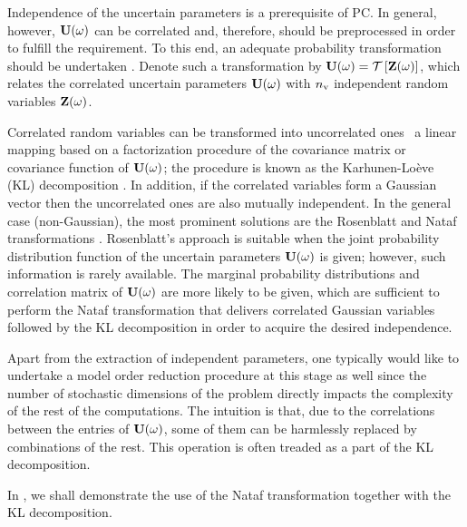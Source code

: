 Independence of the uncertain parameters is a prerequisite of PC.
In general, however, $\mathbf{U}(\omega)$ can be correlated and, therefore, should be preprocessed in order to fulfill the requirement.
To this end, an adequate probability transformation should be undertaken \cite{eldred2009}.
Denote such a transformation by $\vU(\o) = \oTransform{\vZ(\o)}$, which relates the correlated uncertain parameters $\mathbf{U}(\omega)$ with ${n_\text{v}}$ independent random variables $\mathbf{Z}(\omega)$.

Correlated random variables can be transformed into uncorrelated ones \via\ a linear mapping based on a factorization procedure of the covariance matrix or covariance function of $\mathbf{U}(\omega)$; the procedure is known as the Karhunen-Lo\`{e}ve (KL) decomposition \cite{ghanem1991}.
In addition, if the correlated variables form a Gaussian vector then the uncorrelated ones are also mutually independent.
In the general case (non-Gaussian), the most prominent solutions are the Rosenblatt \cite{rosenblatt1952} and Nataf transformations \cite{li2008}.
Rosenblatt's approach is suitable when the joint probability distribution function of the uncertain parameters $\mathbf{U}(\omega)$ is given; however, such information is rarely available.
The marginal probability distributions and correlation matrix of $\mathbf{U}(\omega)$ are more likely to be given, which are sufficient to perform the Nataf transformation that delivers correlated Gaussian variables followed by the KL decomposition in order to acquire the desired independence.

Apart from the extraction of independent parameters, one typically would like to undertake a model order reduction procedure at this stage as well since the number of stochastic dimensions of the problem directly impacts the complexity of the rest of the computations.
The intuition is that, due to the correlations between the entries of $\mathbf{U}(\omega)$, some of them can be harmlessly replaced by combinations of the rest. This operation is often treaded as a part of the KL decomposition.

In , we shall demonstrate the use of the Nataf transformation together with the KL decomposition.
